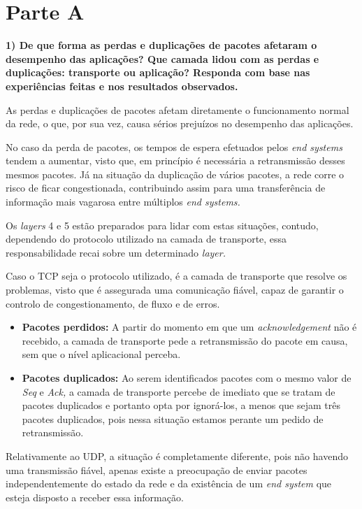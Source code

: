 \section{Parte A}

        \textbf{1) De que forma as perdas e duplicações de pacotes afetaram o desempenho das aplicações? Que camada lidou com as perdas e duplicações: transporte ou aplicação? Responda com base nas experiências feitas e nos resultados observados.}

        As perdas e duplicações de pacotes afetam diretamente o  funcionamento normal da rede, o que, por sua vez, causa sérios prejuízos no desempenho das aplicações.
        
        No caso da perda de pacotes, os tempos de espera efetuados pelos \textit{end systems} tendem a aumentar, visto que, em princípio é necessária a retransmissão desses mesmos pacotes. Já na situação da duplicação de vários pacotes, a rede corre o risco de ficar congestionada, contribuindo assim para uma transferência de informação mais vagarosa entre múltiplos \textit{end systems.}

        Os \textit{layers} 4 e 5 estão preparados para lidar com estas situações, contudo, dependendo do protocolo utilizado na camada de transporte, essa responsabilidade recai sobre um determinado \textit{layer.}

        Caso o TCP seja o protocolo utilizado, é a camada de transporte que resolve os problemas, visto que é assegurada uma comunicação fiável, capaz de garantir o controlo de congestionamento, de fluxo e de erros.

        \begin{itemize}
            \item \textbf{Pacotes perdidos:} A partir do momento em que um \textit{acknowledgement} não é recebido, a camada de transporte pede a retransmissão do pacote em causa, sem que o nível aplicacional perceba.
            \item \textbf{Pacotes duplicados:} Ao serem identificados pacotes com o mesmo valor de \textit{Seq} e \textit{Ack,} a camada de transporte percebe de imediato que se tratam de pacotes duplicados e portanto opta por ignorá-los, a menos que sejam três pacotes duplicados, pois nessa situação estamos perante um pedido de retransmissão.
        \end{itemize}

        Relativamente ao UDP, a situação é completamente diferente, pois não havendo uma transmissão fiável, apenas existe a preocupação de enviar pacotes independentemente do estado da rede e da existência de um \textit{end system} que esteja disposto a receber essa informação.

